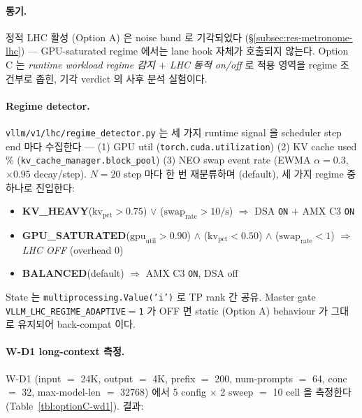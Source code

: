 \paragraph{동기.}
정적 LHC 활성 (Option A) 은 noise band 로 기각되었다
(\S\ref{subsec:res-metronome-lhc}) --- GPU-saturated regime 에서는 lane
hook 자체가 호출되지 않는다. Option C 는 \emph{runtime workload regime
감지 $+$ LHC 동적 on/off} 로 적용 영역을 regime 조건부로 좁힌, 기각
verdict 의 사후 분석 실험이다.

\paragraph{Regime detector.}
\texttt{vllm/v1/lhc/regime\_detector.py} 는 세 가지 runtime signal 을
scheduler step end 마다 수집한다 — (1) GPU util (\texttt{torch.cuda.utilization})
(2) KV cache used \% (\texttt{kv\_cache\_manager.block\_pool})
(3) NEO swap event rate (EWMA $\alpha\!=\!0.3$, $\times 0.95$ decay/step).
$N\!=\!20$ step 마다 한 번 재분류하며 (default), 세 가지 regime 중 하나로 진입한다:

\begin{itemize}
    \item \textbf{KV\_HEAVY}\quad ($\mathrm{kv}_{\mathrm{pct}}\!>\!0.75$) $\lor$ ($\mathrm{swap}_{\mathrm{rate}}\!>\!10/\mathrm{s}$) $\Rightarrow$ DSA \texttt{ON} $+$ AMX C3 \texttt{ON}
    \item \textbf{GPU\_SATURATED}\quad ($\mathrm{gpu}_{\mathrm{util}}\!>\!0.90$) $\land$ ($\mathrm{kv}_{\mathrm{pct}}\!<\!0.50$) $\land$ ($\mathrm{swap}_{\mathrm{rate}}\!<\!1$) $\Rightarrow$ \emph{LHC OFF} (overhead 0)
    \item \textbf{BALANCED}\quad (default) $\Rightarrow$ AMX C3 \texttt{ON}, DSA off
\end{itemize}

State 는 \texttt{multiprocessing.Value('i')} 로 TP rank 간 공유. Master gate
\texttt{VLLM\_LHC\_REGIME\_ADAPTIVE$=$1} 가 OFF 면 static (Option A) behaviour
가 그대로 유지되어 back-compat 이다.

\paragraph{W-D1 long-context 측정.}
W-D1 (input $=$ 24K, output $=$ 4K, prefix $=$ 200, num-prompts $=$ 64,
conc $=$ 32, max-model-len $=$ 32768) 에서 5 config $\times$ 2 sweep $=$ 10 cell
을 측정한다 (Table~\ref{tbl:optionC-wd1}). 결과:

